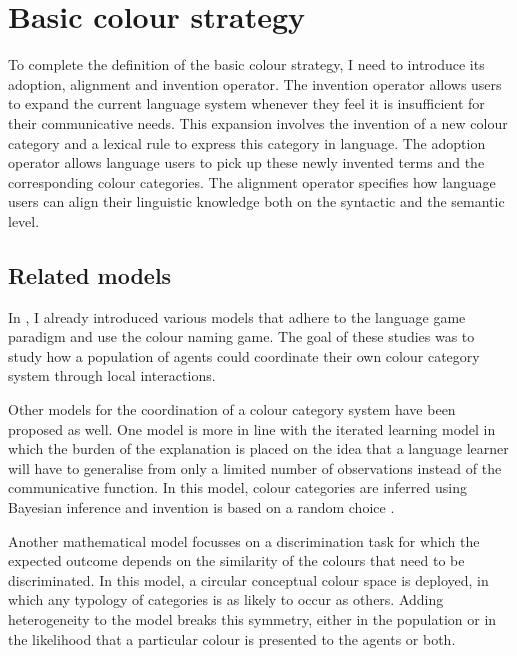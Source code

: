 \chapter{Basic colour strategy}
\label{s:basic-operators}

\setcounter{figure}{1}

To complete the definition of the basic colour strategy, I need
to introduce its adoption, alignment and invention operator. The
invention operator allows users to expand the current language system
whenever they feel it is insufficient for their communicative
needs. This expansion involves the invention of a new colour category
and a lexical rule to express this category in language. The adoption
operator allows language users to pick up these newly invented terms
and the corresponding colour categories. The alignment operator
specifies how language users can align their linguistic knowledge both
on the syntactic and the semantic level.

\section{Related models}

In , I already introduced various models
\citep{steels05coordinating, belpaeme05explaining, belpaeme07language,
  puglisi08cultural, baronchelli10modeling} that adhere to the
language game paradigm and use the colour naming game. The goal of
these studies was to study how a population of agents could coordinate
their own colour category system through local interactions.

Other models for the coordination of a colour category system have
been proposed as well. One model is more in line with the iterated
learning model \citep{smith03iterated} in which the burden of the
explanation is placed on the idea that a language learner will have to
generalise from only a limited number of observations instead of the
communicative function. In this model, colour categories are inferred
using Bayesian inference and invention is based on a random choice
\citep{dowman07explaining}.

Another mathematical model focusses on a discrimination task for which
the expected outcome depends on the similarity of the colours that
need to be discriminated. In this model, a circular conceptual colour
space is deployed, in which any typology of categories is as likely to
occur as others. Adding heterogeneity to the model breaks this symmetry, either in the
population or in the likelihood that a particular colour is presented
to the agents or both\citep{komarova08population}.

